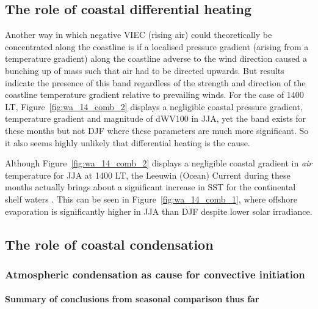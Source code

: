 \subsection{The role of coastal differential heating}

Another way in which negative \ac{VIEC} (rising air) could theoretically be concentrated along the coastline is if a localised pressure gradient (arising from a temperature gradient) along the coastline adverse to the wind direction caused a bunching up of mass such that air had to be directed upwards. But results indicate the presence of this band regardless of the strength and direction of the coastline temperature gradient relative to prevailing winds. For the case of 1400 \ac{LT}, Figure~\ref{fig:wa_14_comb_2} displays a negligible coastal pressure gradient, temperature gradient and magnitude of \ac{dWV100} in \ac{JJA}, yet the band exists for these months but not \ac{DJF} where these parameters are much more significant. So it also seems highly unlikely that differential heating is the cause.

Although Figure~\ref{fig:wa_14_comb_2} displays a negligible coastal gradient in \textit{air} temperature for \ac{JJA} at 1400 \ac{LT}, the Leeuwin (Ocean) Current during these months actually brings about a significant increase in \ac{SST} for the continental shelf waters \citep{berthot1997}. This can be seen in Figure~\ref{fig:wa_14_comb_1}, where offshore evaporation is significantly higher in \ac{JJA} than \ac{DJF} despite lower solar irradiance.

\subsection{The role of coastal condensation}
\label{ssec:coastal_cond}

\subsubsection{Atmospheric condensation as cause for convective initiation}

\paragraph{Summary of conclusions from seasonal comparison thus far}

